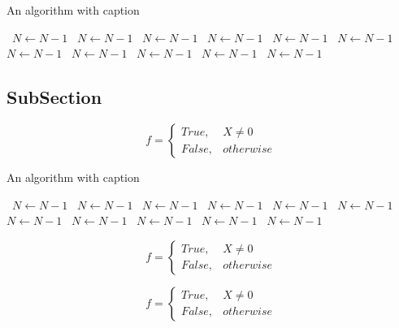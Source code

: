 \documentclass[a4paper]{article}
\begin{document}
\begin{algorithm}
\caption{An algorithm with caption}
\begin{algorithmic}
\    \State $N \gets N - 1$
\    \State $N \gets N - 1$
\    \State $N \gets N - 1$
\    \State $N \gets N - 1$
\    \State $N \gets N - 1$
\    \State $N \gets N - 1$
\    \State $N \gets N - 1$
\    \State $N \gets N - 1$
\    \State $N \gets N - 1$
\    \State $N \gets N - 1$
\    \State $N \gets N - 1$
\EndWhile
\end{algorithmic}
\end{algorithm}

\subsection{SubSection}

\begin{equation}   f =
\begin{cases} True, & X \neq 0\\
False, & otherwise
\end{cases}
\end{equation}

\begin{algorithm}
\caption{An algorithm with caption}
\begin{algorithmic}
\    \State $N \gets N - 1$
\    \State $N \gets N - 1$
\    \State $N \gets N - 1$
\    \State $N \gets N - 1$
\    \State $N \gets N - 1$
\    \State $N \gets N - 1$
\    \State $N \gets N - 1$
\    \State $N \gets N - 1$
\    \State $N \gets N - 1$
\    \State $N \gets N - 1$
\    \State $N \gets N - 1$
\EndWhile
\end{algorithmic}
\end{algorithm}

\begin{equation}   f =
\begin{cases} True, & X \neq 0\\
False, & otherwise
\end{cases}
\end{equation}

\begin{equation}   f =
\begin{cases} True, & X \neq 0\\
False, & otherwise
\end{cases}
\end{equation}
\end{document}
